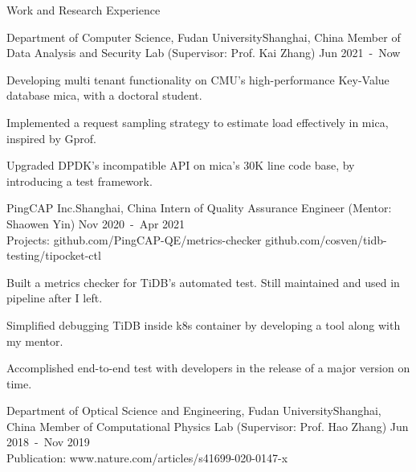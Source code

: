 \documentclass{resume} %
\begin{document}
\begin{rSection}{Work and Research Experience}



\begin{rSubsection}
{Department of Computer Science, Fudan University}{Shanghai, China}
{Member of Data Analysis and Security Lab (Supervisor: Prof. Kai Zhang)} {Jun 2021\ -\ Now}

\item Developing multi tenant functionality on CMU's high-performance Key-Value database mica, with a doctoral student.
\item Implemented a request sampling strategy to estimate load effectively in mica, inspired by Gprof.
\item Upgraded DPDK's incompatible API on mica's 30K line code base, by introducing a test framework.

\end{rSubsection}



\begin{rSubsection}
{PingCAP Inc.}{Shanghai, China}
{Intern of Quality Assurance Engineer (Mentor: Shaowen Yin)} {Nov 2020\ -\ Apr 2021
\\  Projects: github.com/PingCAP-QE/metrics-checker github.com/cosven/tidb-testing/tipocket-ctl
}

\item Built a metrics checker for TiDB's automated test. Still maintained and used in pipeline after I left.
\item Simplified debugging TiDB inside k8s container by developing a tool along with my mentor.
\item Accomplished end-to-end test with developers in the release of a major version on time.



\end{rSubsection}



\begin{rSubsection}
{Department of Optical Science and Engineering, Fudan University}{Shanghai, China}
{Member of Computational Physics Lab (Supervisor: Prof. Hao Zhang)}
{Jun 2018\ -\ Nov 2019
\\ Publication: www.nature.com/articles/s41699-020-0147-x }


\end{rSubsection}
\end{rSection}
\end{document}
